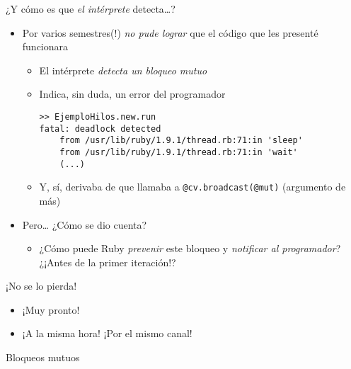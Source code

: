 \documentclass[presentation]{beamer}
\begin{document}
\begin{frame}[label={sec:org98bc216},fragile]{¿Y cómo es que \emph{el intérprete} detecta\ldots{}?}
 \begin{itemize}
\item Por varios semestres(!) \emph{no pude lograr} que el código que les
presenté funcionara
\begin{itemize}
\item El intérprete \emph{detecta un bloqueo mutuo}
\item Indica, sin duda, un error del programador
\begin{verbatim}
>> EjemploHilos.new.run
fatal: deadlock detected
	from /usr/lib/ruby/1.9.1/thread.rb:71:in 'sleep'
	from /usr/lib/ruby/1.9.1/thread.rb:71:in 'wait'
	(...)
\end{verbatim}
\item Y, sí, derivaba de que llamaba a \texttt{@cv.broadcast(@mut)} (argumento
de más)
\end{itemize}
\item Pero\ldots{} ¿Cómo se dio cuenta?
\begin{itemize}
\item ¿Cómo puede Ruby \emph{prevenir} este bloqueo y \emph{notificar al
programador}? ¿¡Antes de la primer iteración!?
\end{itemize}
\end{itemize}
\end{frame}

\begin{frame}[label={sec:org607e16b}]{¡No se lo pierda!}
\begin{itemize}
\item ¡Muy pronto!
\item ¡A la misma hora! ¡Por el mismo canal!
\end{itemize}
\begin{center}
{\Huge Bloqueos mutuos} \vfill {}
\end{center}
\end{frame}
\end{document}
